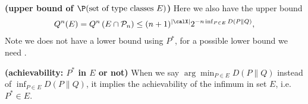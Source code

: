 \documentclass{article}
\newcommand{\bfs}[1]{\textbf{({#1})}}
\newcommand{\typss}{\mathcal{P}_n}
\begin{document}
\begin{rema}{\bfs{upper bound of $\P(\text{set of type classes } E)$}}\label{ld:rem1}
Here we also have the upper bound
\begin{align*} 
Q^{n}(E)=Q^{n}\left(E \cap \typss\right) \leq(n+1)^{| \calX |} 2^{-n \inf _{P \in E} D(P \| Q)},
\end{align*}
Note we does not have a lower bound using $P^{*}$, for a possible lower bound we need . %
\end{rema}

\begin{rema}{\bfs{achievability: $P^{*}$ in $E$ or not}}
When we say $\arg \min _{P \in E} D(P \| Q)$ instead of $\inf _{P \in E} D(P \| Q) $, it implies the achievability of the infimum in set $E$, i.e. $P^{*}\in E$.
\end{rema}
\end{document}
